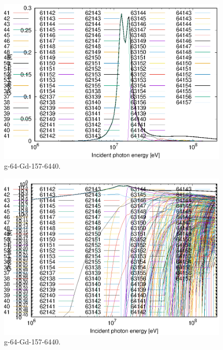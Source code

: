 \begin{figure}
 \includegraphics[width=\linewidth]{eps/g_64-Gd-157_6440.eps}
  \caption{g-64-Gd-157-6440.}
\end{figure}
\begin{figure}
 \includegraphics[width=\linewidth]{eps-log/g_64-Gd-157_6440.eps}
 \caption{g-64-Gd-157-6440.}
\end{figure}
\newpage \clearpage

